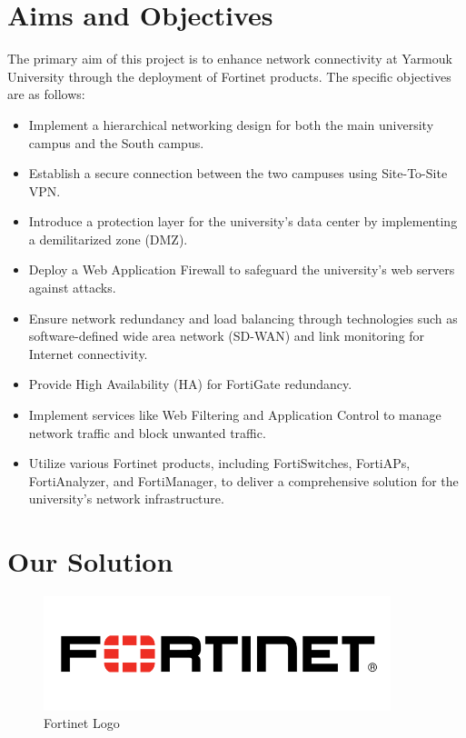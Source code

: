 \documentclass[12pt]{report}
\begin{document}
\section{Aims and Objectives}
The primary aim of this project is to enhance network connectivity at Yarmouk University through the deployment of Fortinet products. The specific objectives are as follows:
\begin{itemize}
    \item Implement a hierarchical networking design for both the main university campus and the South campus.
    \item Establish a secure connection between the two campuses using Site-To-Site VPN.
    \item Introduce a protection layer for the university's data center by implementing a demilitarized zone (DMZ).
    \item Deploy a Web Application Firewall to safeguard the university's web servers against attacks.
    \item Ensure network redundancy and load balancing through technologies such as software-defined wide area network (SD-WAN) and link monitoring for Internet connectivity.
    \item Provide High Availability (HA) for FortiGate redundancy.
    \item Implement services like Web Filtering and Application Control to manage network traffic and block unwanted traffic.
    \item Utilize various Fortinet products, including FortiSwitches, FortiAPs, FortiAnalyzer, and FortiManager, to deliver a comprehensive solution for the university's network infrastructure.
\end{itemize}

\section{Our Solution}
\begin{figure}[h]
    \centering
    \includegraphics[width=0.9\textwidth]{images/fortinet.png}
    \caption{Fortinet Logo}
    \label{fig:fortinet logo}
\end{figure}
\end{document}

